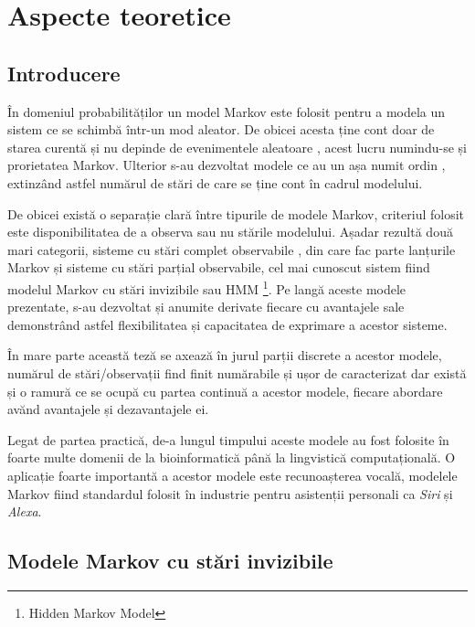 \chapter{Aspecte teoretice}

\section{Introducere}

În domeniul probabilităților un model Markov este folosit pentru a modela un sistem ce se schimbă într-un mod aleator. De obicei acesta ține cont doar de starea curentă și nu depinde de evenimentele aleatoare , acest lucru numindu-se și prorietatea Markov. Ulterior s-au dezvoltat modele ce au un așa numit ordin , extinzând astfel numărul de stări de care se ține cont în cadrul modelului.\par

De obicei există o separație clară între tipurile de modele Markov, criteriul folosit este disponibilitatea de a observa sau nu stările modelului. Așadar rezultă două mari categorii, sisteme cu stări complet observabile , din care fac parte lanțurile Markov și sisteme cu stări parțial observabile, cel mai cunoscut sistem fiind modelul Markov cu stări invizibile sau HMM \footnote{Hidden Markov Model}. Pe langă aceste modele prezentate, s-au dezvoltat și anumite derivate fiecare cu avantajele sale demonstrând astfel flexibilitatea și capacitatea de exprimare a acestor sisteme.\par

În mare parte această teză se axează în jurul parții discrete a acestor modele, numărul de stări/observații find finit numărabile și ușor de caracterizat dar există și o ramură ce se ocupă cu partea continuă a acestor modele, fiecare abordare avănd avantajele și dezavantajele ei.\par

Legat de partea practică, de-a lungul timpului aceste modele au fost folosite în foarte multe domenii de la bioinformatică până la lingvistică computațională. O aplicație foarte importantă a acestor modele este recunoașterea vocală, modelele Markov fiind standardul folosit în industrie pentru asistenții personali ca \textit{Siri} și \textit{Alexa}.\par

\section{Modele Markov cu stări invizibile}

